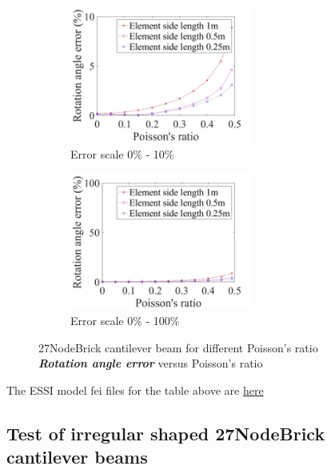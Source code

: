 \documentclass[fleqn,11pt,letter]{article}
\begin{document}
\begin{figure}[H]
  \begin{subfigure}{0.5\textwidth}
    \centering
    \includegraphics[width=6cm]{../Figure_files/27NodeBrick/error27brick_beam_different_poisson_ratio_angle_div.jpeg}
    \caption{Error scale 0\% - 10\%}
  \end{subfigure}
  \begin{subfigure}{0.5\textwidth}
    \centering
    \includegraphics[width=6cm]{../Figure_files/27NodeBrick/error27brick_beam_different_poisson_ratio_angle_div100.jpeg}
    \caption{Error scale 0\% - 100\%}
  \end{subfigure}
  \captionsetup{justification=centering,margin=3cm}
  \caption{27NodeBrick cantilever beam for different Poisson's ratio\\
      \textbf{\emph{Rotation angle error} }  versus   Poisson's ratio}
  \label{table angle error 27NodeBrick cantilever beam for different Poisson ratio}
\end{figure}




The ESSI model fei files for the table above are \href{https://github.com/yuan-energy/ESSI_Verification/blob/master/27NodeBrick/cantilever_different_Poisson/cantilever_different_Poisson.tar.gz?raw=true}{here}




\newpage
\subsection{Test of irregular shaped 27NodeBrick cantilever beams}
\end{document}
